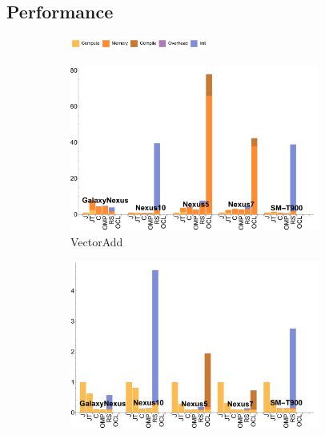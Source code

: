 \subsection{Performance}

\begin{figure}
  \centering
  \begin{subfigure}[b]{\textwidth}
          \centering
          \includegraphics[width=0.5\textwidth]{data/legend.pdf}
  \end{subfigure}

  \begin{subfigure}[b]{0.33\textwidth}
      \centering
      \includegraphics[width=0.9\textwidth]{data/VectorAdd_onecompute_time.pdf}
      \caption{VectorAdd}
  \end{subfigure}
  \begin{subfigure}[b]{0.33\textwidth}
      \centering
      \includegraphics[width=0.9\textwidth]{data/Sgemm_onecompute_time.pdf}

\end{subfigure}
\end{figure}
